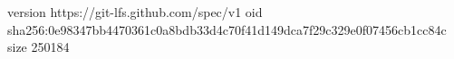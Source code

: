 version https://git-lfs.github.com/spec/v1
oid sha256:0e98347bb4470361c0a8bdb33d4c70f41d149dca7f29c329e0f07456cb1cc84c
size 250184
